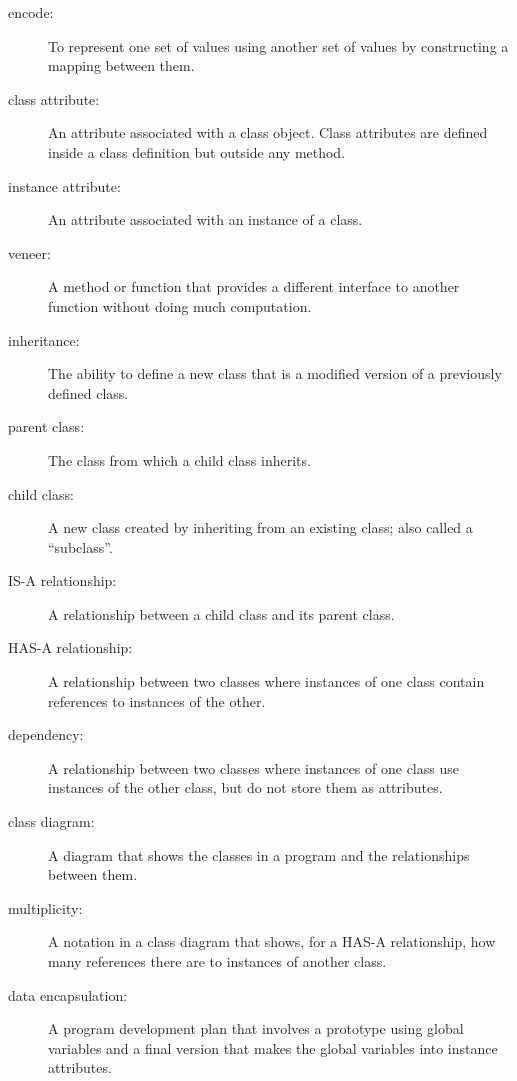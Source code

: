 \documentclass[10pt]{book}
\begin{document}
\begin{description}

\item[encode:]  To represent one set of values using another
set of values by constructing a mapping between them.

\item[class attribute:] An attribute associated with a class
object.  Class attributes are defined inside
a class definition but outside any method.

\item[instance attribute:] An attribute associated with an
instance of a class.

\item[veneer:] A method or function that provides a different
interface to another function without doing much computation.

\item[inheritance:] The ability to define a new class that is a
modified version of a previously defined class.

\item[parent class:] The class from which a child class inherits.

\item[child class:] A new class created by inheriting from an
existing class; also called a ``subclass''.

\item[IS-A relationship:] A relationship between a child class
and its parent class.

\item[HAS-A relationship:] A relationship between two classes
where instances of one class contain references to instances of
the other.

\item[dependency:] A relationship between two classes
where instances of one class use instances of the other class,
but do not store them as attributes.

\item[class diagram:] A diagram that shows the classes in a program
and the relationships between them.

\item[multiplicity:] A notation in a class diagram that shows, for
a HAS-A relationship, how many references there are to instances
of another class.

\item[data encapsulation:]  A program development plan that
involves a prototype using global variables and a final version
that makes the global variables into instance attributes.

\end{description}
\end{document}
